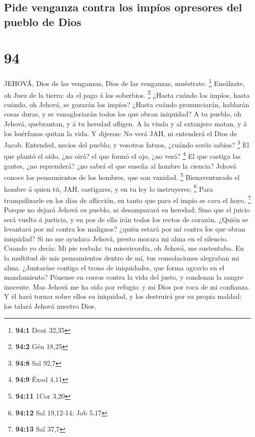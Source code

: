 \hypertarget{pide-venganza-contra-los-impuxedos-opresores-del-pueblo-de-dios}{%
\subsection{Pide venganza contra los impíos opresores del pueblo de
Dios}\label{pide-venganza-contra-los-impuxedos-opresores-del-pueblo-de-dios}}

\hypertarget{section-93}{%
\section{94}\label{section-93}}

 JEHOVÁ, Dios de las venganzas, Dios de las venganzas,
muéstrate. \footnote{\textbf{94:1} Deut 32,35}  Ensálzate,
oh Juez de la tierra: da el pago á los soberbios. \footnote{\textbf{94:2}
  Gén 18,25}  ¿Hasta cuándo los impíos, hasta cuándo, oh
Jehová, se gozarán los impíos?  ¿Hasta cuándo pronunciarán,
hablarán cosas duras, y se vanagloriarán todos los que obran iniquidad?
 A tu pueblo, oh Jehová, quebrantan, y á tu heredad afligen.
 A la viuda y al extanjero matan, y á los huérfanos quitan
la vida.  Y dijeron: No verá JAH, ni entenderá el Dios de
Jacob.  Entended, necios del pueblo; y vosotros fatuos,
¿cuándo seréis sabios? \footnote{\textbf{94:8} Sal 92,7}  El
que plantó el oído, ¿no oirá? el que formó el ojo, ¿no verá? \footnote{\textbf{94:9}
  Éxod 4,11}  El que castiga las gentes, ¿no reprenderá?
¿no sabrá el que enseña al hombre la ciencia?  Jehová
conoce los pensamientos de los hombres, que son vanidad. \footnote{\textbf{94:11}
  1Cor 3,20}  Bienaventurado el hombre á quien tú, JAH,
castigares, y en tu ley lo instruyeres; \footnote{\textbf{94:12} Sal
  19,12-14; Job 5,17}  Para tranquilizarle en los días de
aflicción, en tanto que para el impío se cava el hoyo. \footnote{\textbf{94:13}
  Sal 37,7}  Porque no dejará Jehová su pueblo, ni
desamparará su heredad;  Sino que el juicio será vuelto á
justicia, y en pos de ella irán todos los rectos de corazón.
 ¿Quién se levantará por mí contra los malignos? ¿quién
estará por mí contra los que obran iniquidad?  Si no me
ayudara Jehová, presto morara mi alma en el silencio. 
Cuando yo decía: Mi pie resbala: tu misericordia, oh Jehová, me
sustentaba.  En la multitud de mis pensamientos dentro de
mí, tus consolaciones alegraban mi alma.  ¿Juntaráse
contigo el trono de iniquidades, que forma agravio en el mandamiento?
 Pónense en corros contra la vida del justo, y condenan la
sangre inocente.  Mas Jehová me ha sido por refugio; y mi
Dios por roca de mi confianza.  Y él hará tornar sobre
ellos su iniquidad, y los destruirá por su propia maldad; los talará
Jehová nuestro Dios.

